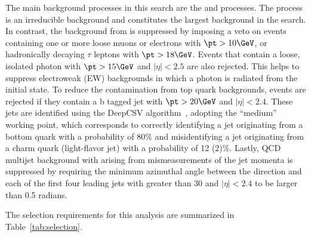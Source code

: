 The main background processes in this search are the \Zvvjets and \Wlvjets processes. The \Zvvjets process is an irreducible 
background and constitutes the largest background in the search. In contrast, the background from \Wlvjets is suppressed by 
imposing a veto on events containing one or more loose muons or electrons with $ \pt >10\GeV$, or hadronically decaying $\tau$ 
leptons with $\pt>18\GeV$. Events that contain a loose, isolated photon with $\pt>15\GeV$ and $|\eta| < 2.5$ are also rejected. 
This helps to suppress electroweak (EW) backgrounds in which a photon is radiated from the initial state.
To reduce the contamination from top quark backgrounds, events are rejected if they contain a b tagged jet with $\pt > 20\GeV$ 
and $|\eta| < 2.4$. These jets are identified using the DeepCSV algorithm~\cite{CMS_NOTE_2018-323,Sirunyan:2017ezt}, 
adopting the ``medium'' working point, which corresponds to correctly identifying a jet originating from a bottom quark with 
a probability of 80\% and misidentifying a jet originating from a charm quark (light-flavor jet) with a probability of 12 (2)\%. 
Lastly, QCD multijet background with \ETm arising from mismeasurements of the jet momenta is suppressed by requiring the minimum
azimuthal angle between the \ptvecmiss direction and each of the first four leading jets with \pt greater than 30\GeV 
and $|\eta| < 2.4$ to be larger than 0.5 radians.

The selection requirements for this analysis are summarized in Table~\ref{tab:selection}.

